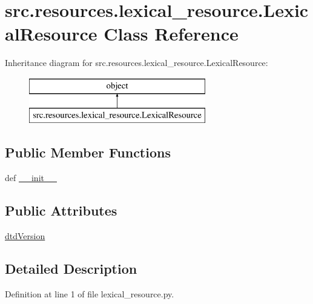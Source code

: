 \hypertarget{classsrc_1_1resources_1_1lexical__resource_1_1_lexical_resource}{\section{src.\+resources.\+lexical\+\_\+resource.\+Lexical\+Resource Class Reference}
\label{classsrc_1_1resources_1_1lexical__resource_1_1_lexical_resource}
}
Inheritance diagram for src.\+resources.\+lexical\+\_\+resource.\+Lexical\+Resource\+:\begin{figure}[H]
\begin{center}
\leavevmode
\includegraphics[height=2.000000cm]{classsrc_1_1resources_1_1lexical__resource_1_1_lexical_resource}
\end{center}
\end{figure}
\subsection*{Public Member Functions}
\begin{DoxyCompactItemize}
\item 
def \hyperlink{classsrc_1_1resources_1_1lexical__resource_1_1_lexical_resource_a199052033eb96620b2de67bf82dc7611}{\+\_\+\+\_\+init\+\_\+\+\_\+}
\end{DoxyCompactItemize}
\subsection*{Public Attributes}
\begin{DoxyCompactItemize}
\item 
\hyperlink{classsrc_1_1resources_1_1lexical__resource_1_1_lexical_resource_a6a1117e091e6d61190d351f8e3f41ef1}{dtd\+Version}
\end{DoxyCompactItemize}


\subsection{Detailed Description}


Definition at line 1 of file lexical\+\_\+resource.\+py.



